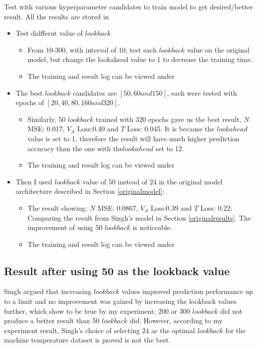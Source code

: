 \documentclass{article}
\begin{document}
Test with various hyperparameter candidates to train model to get
desired/better result. All the results are stored in 
\begin{itemize}
	\setlength{\itemsep}{1pt}
	\setlength{\parskip}{0pt}
	\setlength{\parsep}{0pt}
	\item Test didffernt value of $lookback$
		\begin{itemize}
			\item From 10-300, with interval of 10, test each $lookback$ value on the
original model, but change the lookahead value to 1 to decrease the training
time.
			\item The training and result log can be viewed under
		\end{itemize}
	\item The best $lookback$ candidates are $[50, 60 and 150]$, each were tested
with epochs of $[20, 40, 80, 160 and 320]$. 
		\begin{itemize}
			\item Similarly, 50 $lookback$ trained with 320 epochs gave us the best
result, $N$ MSE: 0.017, $V_A$ Loss:0.40 and $T$ Loss: 0.045. It is because the
$lookahead$ value is set to 1, therefore the result will have much higher
prediction accuracy than the one with the$lookahead$ set to 12.
			\item The training and result log can be viewed under
		\end{itemize}
	\item Then I used $lookback$ value of 50 instead of 24 in the original model
architecture described in Section \ref{originalmodel}:
		\begin{itemize}
			\item The result showing: $N$ MSE: 0.0867, $V_A$ Loss:0.39 and $T$ Loss:
0.22; Comparing the result from Singh's model in Section \ref{originalresults}.
The improvement of using 50 $lookback$ is noticeable.
			\item The training and result log can be viewed under
		\end{itemize}
\end{itemize}

\subsection{Result after using 50 as the lookback value}

Singh argued that increasing $lookback$ values improved prediction performance
up to a limit and no improvement was gained by increasing the lookback values
further, which show to be true by my experiment; 200 or 300 $lookback$ did not
produce a better result than 50 $lookback$ did. However, according to my
experiment result, Singh's choice of selecting 24 as the optimal $lookback$ for
the machine temperature dataset is proved is not the best. 
\end{document}
